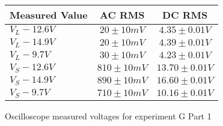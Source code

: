 \begin{figure}[H]    \centering    \begin{tabular}{|l|c|c|}
        \hline
        Measured Value & AC RMS & DC RMS \\
        \hline
        $V_{L} - 12.6\unit{V}$ & $20\pm 10\unit{mV}$ & $4.35\pm 0.01\unit{V}$ \\
        $V_{L} - 14.9\unit{V}$ & $20\pm 10\unit{mV}$ & $4.39\pm 0.01\unit{V}$ \\
        $V_{L} - 9.7\unit{V}$ & $30\pm 10\unit{mV}$ & $4.23\pm 0.01\unit{V}$ \\
        $V_{S} - 12.6\unit{V}$ & $810\pm 10\unit{mV}$ & $13.70\pm 0.01\unit{V}$ \\
        $V_{S} - 14.9\unit{V}$ & $890\pm 10\unit{mV}$ & $16.60\pm 0.01\unit{V}$ \\
        $V_{S} - 9.7\unit{V}$ & $710\pm 10\unit{mV}$ & $10.16\pm 0.01\unit{V}$ \\
        \hline
    \end{tabular}    \caption{Oscilloscope measured voltages for experiment G Part 1}\end{figure}